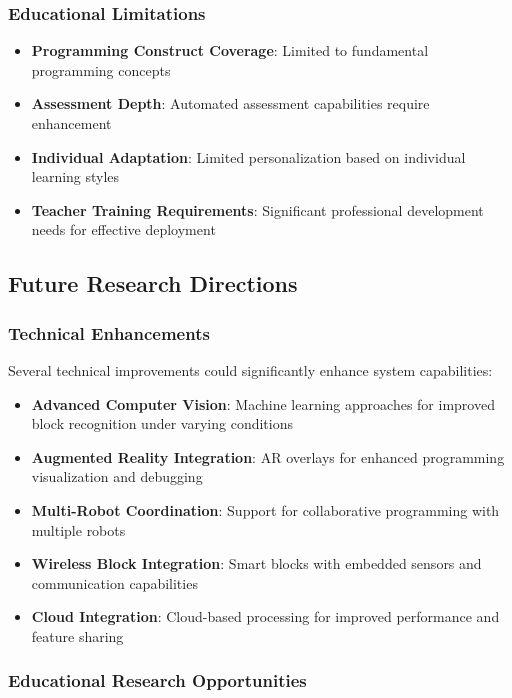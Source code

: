 \subsubsection{Educational Limitations}

\begin{itemize}
    \item \textbf{Programming Construct Coverage}: Limited to fundamental programming concepts
    \item \textbf{Assessment Depth}: Automated assessment capabilities require enhancement
    \item \textbf{Individual Adaptation}: Limited personalization based on individual learning styles
    \item \textbf{Teacher Training Requirements}: Significant professional development needs for effective deployment
\end{itemize}

\subsection{Future Research Directions}

\subsubsection{Technical Enhancements}

Several technical improvements could significantly enhance system capabilities:

\begin{itemize}
    \item \textbf{Advanced Computer Vision}: Machine learning approaches for improved block recognition under varying conditions
    \item \textbf{Augmented Reality Integration}: AR overlays for enhanced programming visualization and debugging
    \item \textbf{Multi-Robot Coordination}: Support for collaborative programming with multiple robots
    \item \textbf{Wireless Block Integration}: Smart blocks with embedded sensors and communication capabilities
    \item \textbf{Cloud Integration}: Cloud-based processing for improved performance and feature sharing
\end{itemize}

\subsubsection{Educational Research Opportunities}

